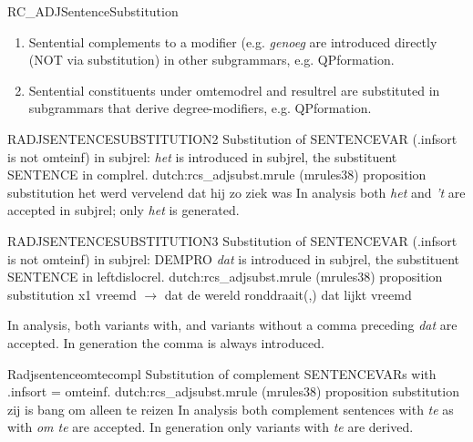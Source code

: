 \begin{mruleclass}{RC\_ADJSentenceSubstitution}
\begin{members}
\begin{member}
\remarks\mbox{}
\begin{enumerate}
  \item 
Sentential complements to a modifier (e.g. {\em genoeg} are introduced
directly (NOT via
substitution) in 
other subgrammars, e.g. QPformation. 
  \item
Sentential constituents under omtemodrel and resultrel are substituted in 
subgrammars that derive degree-modifiers, e.g. QPformation.
\end{enumerate}
\end{member}
\begin{member}
 RADJSENTENCESUBSTITUTION2
 Substitution of SENTENCEVAR (.infsort is not omteinf) 
in subjrel: {\em het} is introduced
in subjrel, the substituent SENTENCE in complrel.
\file dutch:rcs\_adjsubst.mrule (mrules38)
\semantics proposition substitution
\example\mbox{}
het werd vervelend dat hij zo ziek was
\remarks\mbox{}
In analysis both {\em het } and {\em 't } are accepted in subjrel; 
only {\em het} is 
generated.

\end{member}
\begin{member}
 RADJSENTENCESUBSTITUTION3
Substitution of SENTENCEVAR (.infsort is not omteinf) in subjrel: DEMPRO 
{\em dat} is introduced
in subjrel, the substituent SENTENCE in leftdislocrel.
\file dutch:rcs\_adjsubst.mrule (mrules38)
\semantics proposition substitution
\example\mbox{}
x1 vreemd $\rightarrow$ dat de wereld ronddraait(,) dat lijkt vreemd

\remarks\mbox{}
In analysis, both variants with, and variants without a comma preceding {\em 
dat} are accepted. In generation the comma is always introduced.
\end{member}
\begin{member}
 Radjsentenceomtecompl
  Substitution of complement SENTENCEVARs
with .infsort = omteinf.
\file dutch:rcs\_adjsubst.mrule (mrules38)
\semantics proposition substitution
\example\mbox{}
zij is bang om alleen te reizen
\remarks\mbox{}
In analysis both complement 
sentences with {\em te} as with {\em om te} are accepted.
In generation only variants with {\em te} are derived.


\end{member}
\end{members}
\end{mruleclass}
